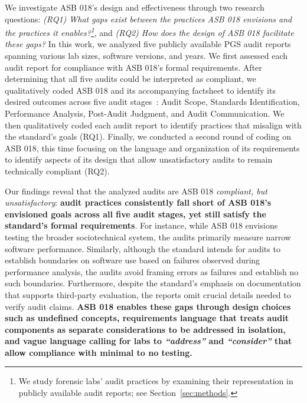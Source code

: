 We investigate ASB 018's design and effectiveness through two research questions: \textit{(RQ1) What gaps exist between the practices ASB 018 envisions and the practices it enables?\footnote{We study forensic labs' audit practices by examining their representation in publicly available audit reports; see Section~\ref{sec:methods}.}}, and \textit{(RQ2) How does the design of ASB 018 facilitate these gaps?} In this work, we analyzed five publicly available PGS audit reports spanning various lab sizes, software versions, and years. We first assessed each audit report for compliance with ASB 018’s formal requirements. After determining that all five audits could be interpreted as compliant, we qualitatively coded ASB 018 and its accompanying factsheet to identify its desired outcomes across five audit stages~\cite{ojewale2025towards}: Audit Scope, Standards Identification, Performance Analysis, Post-Audit Judgment, and Audit Communication. We then qualitatively coded each audit report to identify practices that misalign with the standard’s goals (RQ1). Finally, we conducted a second round of coding on ASB 018, this time focusing on the language and organization of its requirements to identify aspects of its design that allow unsatisfactory audits to remain technically compliant (RQ2).

Our findings reveal that the analyzed audits are ASB 018 \textit{compliant, but unsatisfactory}: \textbf{audit practices consistently fall short of ASB 018’s envisioned goals across all five audit stages, yet still satisfy the standard's formal requirements}. For instance, while ASB 018 envisions testing the broader sociotechnical system, the audits primarily measure narrow software performance. Similarly, although the standard intends for audits to establish boundaries on software use based on failures observed during performance analysis, the audits avoid framing errors as failures and establish no such boundaries. Furthermore, despite the standard's emphasis on documentation that supports third-party evaluation, the reports omit crucial details needed to verify audit claims. \textbf{ASB 018 enables these gaps through design choices such as undefined concepts, requirements language that treats audit components as separate considerations to be addressed in isolation, and vague language calling for labs to \textit{``address''} and \textit{``consider''} that allow compliance with minimal to no testing.}


